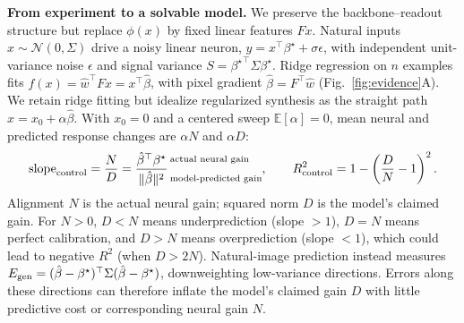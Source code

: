 \documentclass[12pt,a4paper]{article}
\newcommand{\head}[1]{\par\noindent\textbf{#1}\enspace\ignorespaces}
\newcommand{\bh}{\hat\beta}
\newcommand{\bt}{\beta^\star}
\begin{document}
\head{From experiment to a solvable model.}
We preserve the backbone--readout structure but replace $\phi(x)$ by fixed linear features $Fx$. Natural inputs $x\sim\mathcal N(0,\Sigma)$ drive a noisy linear neuron, $y=x^\top\bt+\sigma\epsilon$, with independent unit-variance noise $\epsilon$ and signal variance $S={\bt}^\top\Sigma\bt$. Ridge regression on $n$ examples fits $f(x)=\hat w^\top Fx=x^\top\bh$, with pixel gradient $\bh=F^\top\hat w$ (Fig.~\ref{fig:evidence}A). We retain ridge fitting but idealize regularized synthesis as the straight path $x=x_0+\alpha\bh$. With $x_0=0$ and a centered sweep $\mathbb E[\alpha]=0$, mean neural and predicted response changes are $\alpha N$ and $\alpha D$:
\begin{equation}
\mathrm{slope}_{\rm control}=\frac ND=
\frac{\bh^\top\bt}{\|\bh\|^2}\,
\begin{subarray}{l}
\text{actual neural gain}\\[8pt]
\text{model-predicted gain}
\end{subarray},
\qquad R^2_{\rm control}=1-\left(\frac DN-1\right)^2.
\label{eq:geometry}
\end{equation}
Alignment $N$ is the actual neural gain; squared norm $D$ is the model's claimed gain. For $N>0$, $D<N$ means underprediction (slope $>1$), $D=N$ means perfect calibration, and $D>N$ means overprediction (slope $<1$), which could lead to negative $R^2$ (when $D>2N$). Natural-image prediction instead measures $E_{\rm gen}=(\bh-\bt)^\top\Sigma(\bh-\bt)$, downweighting low-variance directions. Errors along these directions can therefore inflate the model's claimed gain $D$ with little predictive cost or corresponding neural gain $N$.
\end{document}
